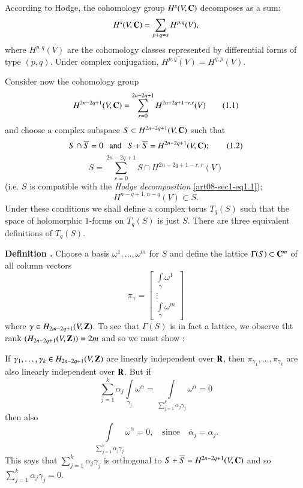According to Hodge, the cohomology group $H^{s}(V,\mathbf{C})$ decomposes as a sum:
$$
H^{s}(V,\mathbf{C})=\sum\limits_{p+q=s}H^{p,q}(V),
$$
where $H^{p,q}(V)$ are the cohomology classes represented by differential forms of type $(p,q)$. Under complex conjugation, $\overline{H^{p,q}(V)}=H^{q,p}(V)$. 

Consider now the cohomology group
\begin{equation*}
H^{2n-2q+1}(V,\mathbf{C})=\sum\limits^{2n-2q+1}_{r=0}H^{2n-2q+1-r,r}(V)\tag{1.1}\label{art08-sec1-eq1.1}
\end{equation*}
and choose a complex subspace $S\subset H^{2n-2q+1}(V,\mathbf{C})$ such that
\begin{equation*}
S\cap \overline{S}=0\text{~~ and ~~} S+\overline{S}=H^{2n-2q+1}(V,\mathbf{C});\tag{1.2}\label{art08-sec1-eq1.2}
\end{equation*}
\begin{equation*}
S=\sum\limits^{2n-2q+1}_{r=0}S\cap H^{2n-2q+1-r,r}(V)\tag{1.3}\label{art08-sec1-eq1.3}
\end{equation*}
(i.e. $S$ is compatible with the {\em Hodge decomposition} \eqref{art08-sec1-eq1.1});
\begin{equation*}
H^{n-q+1,n-q}(V)\subset S.\tag{1.4}\label{art08-sec1-eq1.4}
\end{equation*}
Under these conditions we shall define a complex torus $T_{q}(S)$ such that the space of holomorphic $1$-forms on $T_{q}(S)$ is just $S$. There are three equivalent definitions of $T_{q}(S)$.

\medskip
\noindent
{\bf Definition .\label{art08-sec1-defi1}}
Choose a basis $\omega^{1},\ldots,\omega^{m}$ for $S$ and define the lattice $\Gamma(S)\subset \mathbf{C}^{m}$ of all column vectors 
$$
\pi_{\gamma}=\left[\begin{smallmatrix} \int\limits_{\gamma}\omega^{1}\\ \vdots\\ \int\limits_{\gamma}\omega^{m}\end{smallmatrix}\right]
$$ 
where $\gamma\in H_{2m-2q+1}(V,\mathbf{Z})$. To see that $\Gamma(S)$ is in fact a lattice, we observe tht rank $(H_{2n-2q+1}(V,\mathbf{Z}))=2m$ and so we must show :
\smallskip

If $\gamma_{1},\ldots,\gamma_{k}\in H_{2n-2q+1}(V,\mathbf{Z})$ are linearly independent over $\mathbf{R}$, then $\pi_{\gamma_{1}},\ldots,\pi_{\gamma_{k}}$ are also linearly independent over $\mathbf{R}$. But if 
$$
\sum\limits^{k}_{j=1}\alpha_{j}\int\limits_{\gamma_{j}}\omega^{\alpha}=\int\limits_{\sum\limits^{k}_{j=1}\alpha_{j}\gamma_{j}} \omega^{\alpha}=0
$$\pageoriginale
then also
$$
\int\limits_{\sum\limits^{k}_{j=1}\alpha_{j}\gamma_{j}}\overline{\omega}^{\alpha}=0,\quad\text{since}\quad \overline{\alpha}_{j}=\alpha_{j}.
$$
This says that $\sum\limits^{k}_{j=1}\alpha_{j}\gamma_{j}$ is orthogonal to $S+\overline{S}=H^{2n-2q+1}(V,\mathbf{C})$ and so $\sum\limits^{k}_{j=1}\alpha_{j}\gamma_{j}=0$.

